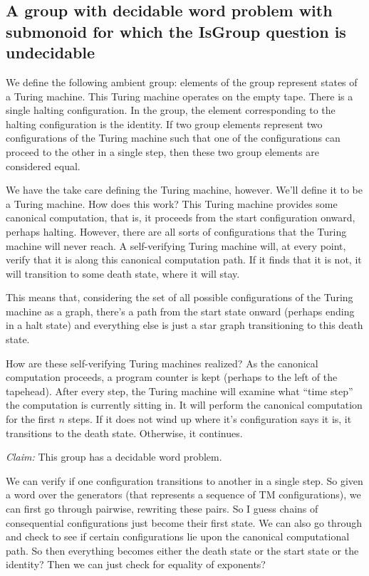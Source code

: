 \documentclass[11pt]{article}
\begin{document}
\subsection{A group with decidable word problem with submonoid for
  which the IsGroup question is undecidable}


We define the following ambient group: elements of the group represent
states of a Turing machine. This Turing machine operates on the empty
tape. There is a single halting configuration. In the group, the
element corresponding to the halting configuration is the identity. If
two group elements represent two configurations of the Turing machine
such that one of the configurations can proceed to the other in a
single step, then these two group elements are considered equal.

We have the take care defining the Turing machine, however. We'll
define it to be a  Turing machine. How does this
work? This Turing machine provides some canonical computation, that
is, it proceeds from the start configuration onward, perhaps
halting. However, there are all sorts of configurations that the
Turing machine will never reach. A self-verifying Turing machine will,
at every point, verify that it is along this canonical computation
path. If it finds that it is not, it will transition to some death
state, where it will stay.

This means that, considering the set of all possible configurations of
the Turing machine as a graph, there's a path from the start state
onward (perhaps ending in a halt state) and everything else is just a
star graph transitioning to this death state.

How are these self-verifying Turing machines realized? As the
canonical computation proceeds, a program counter is kept (perhaps to
the left of the tapehead). After every step, the Turing machine will
examine what ``time step'' the computation is currently sitting in. It
will perform the canonical computation for the first $n$ steps. If it
does not wind up where it's configuration says it is, it transitions
to the death state. Otherwise, it continues.

\textit{Claim:} This group has a decidable word problem.

We can verify if one configuration transitions to another in a single
step. So given a word over the generators (that represents a sequence
of TM configurations), we can first go through pairwise, rewriting
these pairs. So I guess chains of consequential configurations just
become their first state. We can also go through and check to see if
certain configurations lie upon the canonical computational path. So
then everything becomes either the death state or the start state or
the identity? Then we can just check for equality of exponents?
\end{document}
